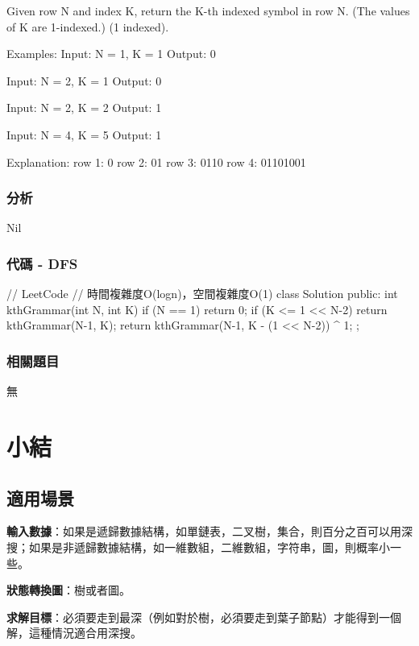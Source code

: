 Given row N and index K, return the K-th indexed symbol in row N. (The values of K are 1-indexed.) (1 indexed).

\begin{Code}
Examples:
Input: N = 1, K = 1
Output: 0

Input: N = 2, K = 1
Output: 0

Input: N = 2, K = 2
Output: 1

Input: N = 4, K = 5
Output: 1

Explanation:
row 1: 0
row 2: 01
row 3: 0110
row 4: 01101001
\end{Code}

\subsubsection{分析}
Nil

\subsubsection{代碼 - DFS}
\begin{Code}
// LeetCode
// 時間複雜度O(logn)，空間複雜度O(1)
class Solution {
public:
    int kthGrammar(int N, int K) {
        if (N == 1) return 0;
        if (K <= 1 << N-2)
            return kthGrammar(N-1, K);
        return kthGrammar(N-1, K - (1 << N-2)) ^ 1;
    }
};
\end{Code}

\subsubsection{相關題目}
\begindot
\item 無
\myenddot

\section{小結} %
\label{sec:dfs-template}


\subsection{適用場景}

\textbf{輸入數據}：如果是遞歸數據結構，如單鏈表，二叉樹，集合，則百分之百可以用深搜；如果是非遞歸數據結構，如一維數組，二維數組，字符串，圖，則概率小一些。

\textbf{狀態轉換圖}：樹或者圖。

\textbf{求解目標}：必須要走到最深（例如對於樹，必須要走到葉子節點）才能得到一個解，這種情況適合用深搜。


